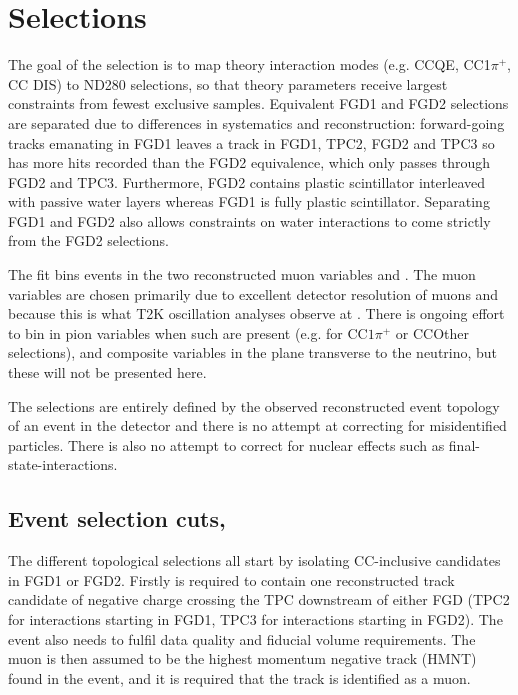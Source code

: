 \section{Selections}
\label{sec:ND280:sel}
The goal of the selection is to map theory interaction modes (e.g. CCQE, CC1$\pi^+$, CC DIS) to ND280 selections, so that theory parameters receive largest constraints from fewest exclusive samples. Equivalent FGD1 and FGD2 selections are separated due to differences in systematics and reconstruction: forward-going tracks emanating in FGD1 leaves a track in FGD1, TPC2, FGD2 and TPC3 so has more hits recorded than the FGD2 equivalence, which only passes through FGD2 and TPC3. Furthermore, FGD2 contains plastic scintillator interleaved with passive water layers whereas FGD1 is fully plastic scintillator. Separating FGD1 and FGD2 also allows constraints on water interactions to come strictly from the FGD2 selections.

The fit bins events in the two reconstructed muon variables \pmu and \cosmu. The muon variables are chosen primarily due to excellent detector resolution of muons and because this is what T2K oscillation analyses observe at \sk. There is ongoing effort to bin in pion variables when such are present (e.g. for CC$1\pi^+$ or CCOther selections), and composite variables in the plane transverse to the neutrino, but these will not be presented here.

The selections are entirely defined by the observed reconstructed event topology of an event in the detector and there is no attempt at correcting for misidentified particles. There is also no attempt to correct for nuclear effects such as final-state-interactions.

\subsection{Event selection cuts, \numu}
\label{sec:numu_sel}
The different topological selections all start by isolating CC-inclusive candidates in FGD1 or FGD2. Firstly is required to contain one reconstructed track candidate of negative charge crossing the TPC downstream of either FGD (TPC2 for interactions starting in FGD1, TPC3 for interactions starting in FGD2). The event also needs to fulfil data quality and fiducial volume requirements. The muon is then assumed to be the highest momentum negative track (HMNT) found in the event, and it is required that the track is identified as a muon.

